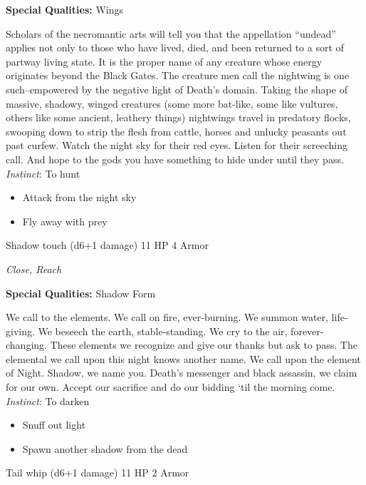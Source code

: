 \textbf{Special Qualities:}
Wings

\HRule
Scholars of the necromantic arts will tell you that the appellation ``undead'' applies not only to those who have lived, died, and been returned to a sort of partway living state. It is the proper name of any creature whose energy originates beyond the Black Gates. The creature men call the nightwing is one such--empowered by the negative light of Death's domain. Taking the shape of massive, shadowy, winged creatures (some more bat-like, some like vultures, others like some ancient, leathery things) nightwings travel in predatory flocks, swooping down to strip the flesh from cattle, horses and unlucky peasants out past curfew. Watch the night sky for their red eyes. Listen for their screeching call. And hope to the gods you have something to hide under until they pass. \emph{Instinct}: To hunt
\begin{itemize}
\item Attack from the night sky
\item Fly away with prey
\end{itemize}

\HRule
{}

Shadow touch (d6+1 damage)\hspace*{\fill} 11 HP 4 Armor

\emph{Close, Reach}

\textbf{Special Qualities:}
Shadow Form

\HRule
We call to the elements. We call on fire, ever-burning. We summon water, life-giving. We beseech the earth, stable-standing. We cry to the air, forever-changing. These elements we recognize and give our thanks but ask to pass. The elemental we call upon this night knows another name. We call upon the element of Night. Shadow, we name you. Death's messenger and black assassin, we claim for our own. Accept our sacrifice and do our bidding `til the morning come. \emph{Instinct}: To darken
\begin{itemize}
\item Snuff out light
\item Spawn another shadow from the dead
\end{itemize}
\newpage
\HRule
{}

Tail whip (d6+1 damage)\hspace*{\fill} 11 HP 2 Armor

